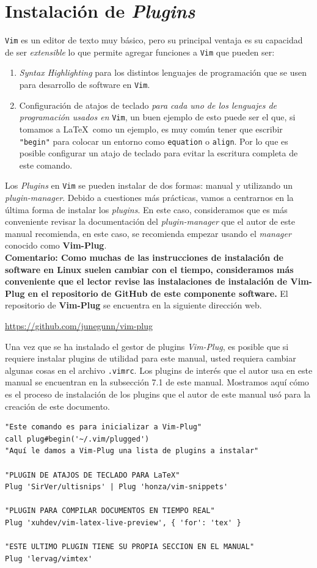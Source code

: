 \documentclass[10pt]{article}
\begin{document}
\section{Instalación de \textit{Plugins}}
\texttt{Vim} es un editor de texto muy básico, pero su principal ventaja es su capacidad de ser \textit{extensible} lo que permite agregar funciones a \texttt{Vim} que pueden ser:
\begin{enumerate}
	\item \textit{Syntax Highlighting} para los distintos lenguajes de programación que se usen para desarrollo de software en \texttt{Vim}.
	\item Configuración de atajos de teclado \textit{para cada uno de los lenguajes de programación usados en} \texttt{Vim}, un buen ejemplo de esto puede ser el que, si tomamos a \LaTeX \  como un ejemplo, es muy común tener que escribir \texttt{"begin"} para colocar un entorno como \texttt{equation} o \texttt{align}. Por lo que es posible configurar un atajo de teclado para evitar la escritura completa de este comando.  
\end{enumerate}
Los \textit{Plugins} en \texttt{Vim} se pueden instalar de dos formas: manual y utilizando un \textit{plugin-manager}. Debido a cuestiones más prácticas, vamos a centrarnos en la última forma de instalar los \textit{plugins}. En este caso, consideramos que es más conveniente revisar la documentación del \textit{plugin-manager} que el autor de este manual recomienda, en este caso, se recomienda empezar usando el \textit{manager} conocido como \textbf{Vim-Plug}.\\
\textbf{Comentario: Como muchas de las instrucciones de instalación de software en Linux suelen cambiar con el tiempo, consideramos más conveniente que el lector revise las instalaciones de instalación de Vim-Plug en el repositorio de GitHub de este componente software.} El repositorio de \textbf{Vim-Plug} se encuentra en la siguiente dirección web. 
\begin{center}
\url{https://github.com/junegunn/vim-plug}	
\end{center}
Una vez que se ha instalado el gestor de plugins \textit{Vim-Plug}, es posible que si requiere instalar plugins de utilidad para este manual, usted requiera cambiar algunas cosas en el archivo \texttt{.vimrc}. Los plugins de interés que el autor usa en este manual se encuentran en la subsección 7.1 de este manual. Mostramos aquí cómo es el proceso de instalación de los plugins que el autor de este manual usó para la creación de este documento. 
\begin{verbatim}
"Este comando es para inicializar a Vim-Plug"
call plug#begin('~/.vim/plugged')
"Aquí le damos a Vim-Plug una lista de plugins a instalar"

"PLUGIN DE ATAJOS DE TECLADO PARA LaTeX"
Plug 'SirVer/ultisnips' | Plug 'honza/vim-snippets'

"PLUGIN PARA COMPILAR DOCUMENTOS EN TIEMPO REAL"
Plug 'xuhdev/vim-latex-live-preview', { 'for': 'tex' }

"ESTE ULTIMO PLUGIN TIENE SU PROPIA SECCION EN EL MANUAL"
Plug 'lervag/vimtex'
\end{verbatim}
\end{document}
